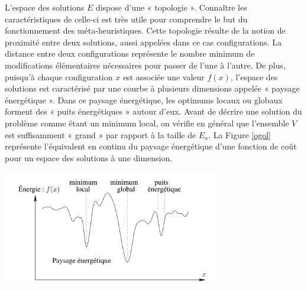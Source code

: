 L'espace des solutions $E$ dispose d'une « topologie ». Connaître les caractéristiques de celle-ci est très utile pour comprendre le but du fonctionnement des méta-heuristiques. Cette topologie résulte de la notion de proximité entre deux solutions, aussi appelées dans ce cas configurations. La distance entre deux configurations représente le nombre minimum de modifications élémentaires nécessaires pour passer de l'une à l'autre. De plus, puisqu'à chaque configuration $x$ est associée une valeur $f(x)$, l'espace des solutions est caractérisé par une courbe à plusieurs dimensions appelée « paysage énergétique ». Dans ce paysage énergétique, les optimums locaux ou globaux forment des « puits énergétiques » autour d'eux. Avant de décrire une solution du problème comme étant un minimum local, on vérifie en général que l'ensemble $V$ est suffisamment « grand » par rapport à la taille de $E_a$. La Figure \ref{ogol} représente l'équivalent en continu du paysage énergétique d'une fonction de coût pour un espace des solutions à une dimension.\\

\begin{center} 
	\includegraphics[height=2in]{img/Optimum_global_optimum_local.png}	
	 \label{ogol}
\end{center}